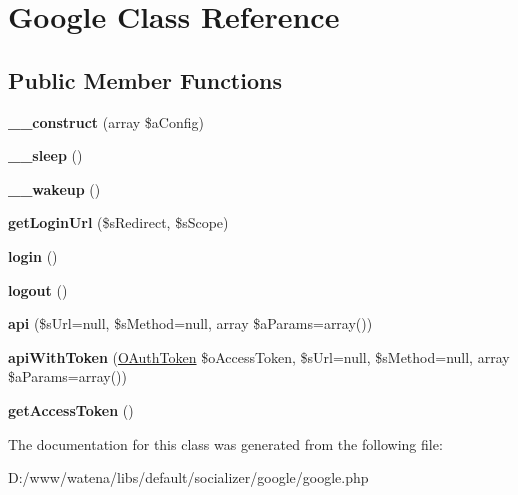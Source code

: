 \hypertarget{class_google}{\section{Google Class Reference}
\label{class_google}
}
\subsection*{Public Member Functions}
\begin{DoxyCompactItemize}
\item 
\hypertarget{class_google_a3dcba9e5cd5f5fa364360c6d8d652df0}{{\bfseries \-\_\-\-\_\-construct} (array \$a\-Config)}\label{class_google_a3dcba9e5cd5f5fa364360c6d8d652df0}

\item 
\hypertarget{class_google_a1a0b1d296e56c3004e1310c3afa71ba7}{{\bfseries \-\_\-\-\_\-sleep} ()}\label{class_google_a1a0b1d296e56c3004e1310c3afa71ba7}

\item 
\hypertarget{class_google_a9687eb61289544d211f302b66a4002b5}{{\bfseries \-\_\-\-\_\-wakeup} ()}\label{class_google_a9687eb61289544d211f302b66a4002b5}

\item 
\hypertarget{class_google_a9e043aaceb7ade1f40eb4b570dc055f7}{{\bfseries get\-Login\-Url} (\$s\-Redirect, \$s\-Scope)}\label{class_google_a9e043aaceb7ade1f40eb4b570dc055f7}

\item 
\hypertarget{class_google_ab30372dbf33102e42e1d72afd00e6858}{{\bfseries login} ()}\label{class_google_ab30372dbf33102e42e1d72afd00e6858}

\item 
\hypertarget{class_google_a6dc60cb187fb077bab72044b2169d5c5}{{\bfseries logout} ()}\label{class_google_a6dc60cb187fb077bab72044b2169d5c5}

\item 
\hypertarget{class_google_afde116ee3cee79747006cf32a23d85a1}{{\bfseries api} (\$s\-Url=null, \$s\-Method=null, array \$a\-Params=array())}\label{class_google_afde116ee3cee79747006cf32a23d85a1}

\item 
\hypertarget{class_google_aba6d320577358fe8b9db6d46a1fbecd1}{{\bfseries api\-With\-Token} (\hyperlink{class_o_auth_token}{O\-Auth\-Token} \$o\-Access\-Token, \$s\-Url=null, \$s\-Method=null, array \$a\-Params=array())}\label{class_google_aba6d320577358fe8b9db6d46a1fbecd1}

\item 
\hypertarget{class_google_aba6922328e637c458b0a8f73e6b66e33}{{\bfseries get\-Access\-Token} ()}\label{class_google_aba6922328e637c458b0a8f73e6b66e33}

\end{DoxyCompactItemize}


The documentation for this class was generated from the following file\-:\begin{DoxyCompactItemize}
\item 
D\-:/www/watena/libs/default/socializer/google/google.\-php\end{DoxyCompactItemize}
